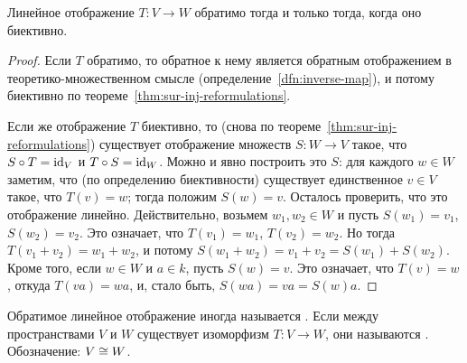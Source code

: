 \begin{proposition}\label{prop:invertible-linear-iff-iso}
Линейное отображение $T\colon V\to W$ обратимо тогда и только тогда, когда
оно биективно.
\end{proposition}
\begin{proof}
Если $T$ обратимо, то обратное к нему является обратным отображением
в теоретико-множественном смысле (определение~\ref{dfn:inverse-map}),
и потому биективно по теореме~\ref{thm:sur-inj-reformulations}.

Если же отображение $T$ биективно, то
(снова по теореме~\ref{thm:sur-inj-reformulations}) существует отображение
множеств $S\colon W\to V$ такое, что $S\circ T = \operatorname{id}_V$ и $T\circ S = \operatorname{id}_W$.
Можно и явно построить это $S$: для каждого $w\in W$ заметим,
что (по определению биективности) существует единственное $v\in V$
такое, что $T(v) = w$; тогда положим $S(w) = v$.
Осталось проверить, что это отображение линейно. Действительно,
возьмем $w_1,w_2\in W$ и пусть $S(w_1) = v_1$, $S(w_2) = v_2$.
Это означает, что $T(v_1)=w_1$, $T(v_2)=w_2$.
Но тогда $T(v_1+v_2) = w_1+w_2$, и потому $S(w_1+w_2) = v_1+v_2 = S(w_1)+S(w_2)$.
Кроме того, если $w\in W$ и $a\in k$, пусть $S(w) = v$.
Это означает, что $T(v) = w$, откуда $T(va) = wa$, и, стало быть,
$S(wa) = va = S(w)a$.
\end{proof}

\begin{definition}
Обратимое линейное отображение иногда называется . Если между
пространствами $V$ и $W$ существует изоморфизм $T\colon V\to W$,
они называются . Обозначение: $V\cong W$.
\end{definition}

